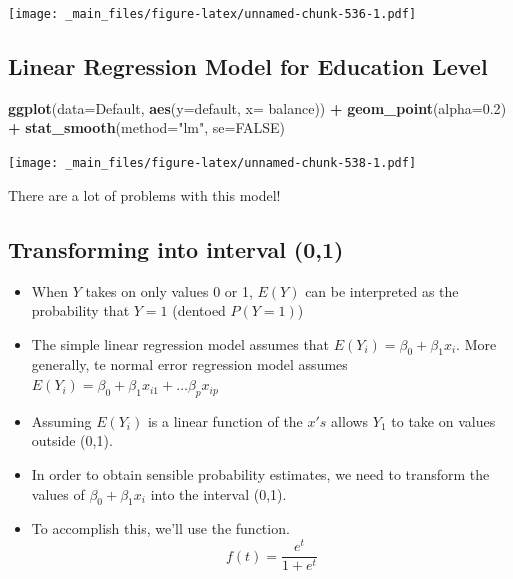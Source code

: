\documentclass[]{book}
\newenvironment{Shaded}{\begin{snugshade}}{\end{snugshade}}
\newcommand{\KeywordTok}[1]{\textcolor[rgb]{0.13,0.29,0.53}{\textbf{#1}}}
\newcommand{\DataTypeTok}[1]{\textcolor[rgb]{0.13,0.29,0.53}{#1}}
\newcommand{\FloatTok}[1]{\textcolor[rgb]{0.00,0.00,0.81}{#1}}
\newcommand{\StringTok}[1]{\textcolor[rgb]{0.31,0.60,0.02}{#1}}
\newcommand{\CommentTok}[1]{\textcolor[rgb]{0.56,0.35,0.01}{\textit{#1}}}
\newcommand{\OtherTok}[1]{\textcolor[rgb]{0.56,0.35,0.01}{#1}}
\newcommand{\OperatorTok}[1]{\textcolor[rgb]{0.81,0.36,0.00}{\textbf{#1}}}
\newcommand{\NormalTok}[1]{#1}
\begin{document}
\texttt{[image: \_main\_files/figure-latex/unnamed-chunk-536-1.pdf]}

\subsection{Linear Regression Model for Education
Level}\label{linear-regression-model-for-education-level}

\begin{Shaded}
\end{Shaded}

\begin{Shaded}
\begin{Highlighting}[]
\KeywordTok{ggplot}\NormalTok{(}\DataTypeTok{data=}\NormalTok{Default, }\KeywordTok{aes}\NormalTok{(}\DataTypeTok{y=}\NormalTok{default, }\DataTypeTok{x=}\NormalTok{ balance)) }\OperatorTok{+}\StringTok{ }\KeywordTok{geom_point}\NormalTok{(}\DataTypeTok{alpha=}\FloatTok{0.2}\NormalTok{)  }\OperatorTok{+}\StringTok{ }\KeywordTok{stat_smooth}\NormalTok{(}\DataTypeTok{method=}\StringTok{"lm"}\NormalTok{, }\DataTypeTok{se=}\OtherTok{FALSE}\NormalTok{)}
\end{Highlighting}
\end{Shaded}

\texttt{[image: \_main\_files/figure-latex/unnamed-chunk-538-1.pdf]}

There are a lot of problems with this model!

\subsection{Transforming into interval
(0,1)}\label{transforming-into-interval-01}

\begin{itemize}
\item
  When \(Y\) takes on only values 0 or 1, \(E(Y)\) can be interpreted as
  the probability that \(Y=1\) (dentoed \(P(Y=1)\))
\item
  The simple linear regression model assumes that
  \(E(Y_i) = \beta_0+\beta_1x_i\). More generally, te normal error
  regression model assumes
  \(E(Y_i) = \beta_0+\beta_1x_{i1} + \ldots \beta_px_{ip}\)
\item
  Assuming \(E(Y_i)\) is a linear function of the \(x's\) allows \(Y_1\)
  to take on values outside (0,1).
\item
  In order to obtain sensible probability estimates, we need to
  transform the values of \(\beta_0+\beta_1x_i\) into the interval
  (0,1).
\item
  To accomplish this, we'll use the function. \[
  f(t)=\frac{e^t}{1+e^{t}}
  \]
\end{itemize}
\end{document}

